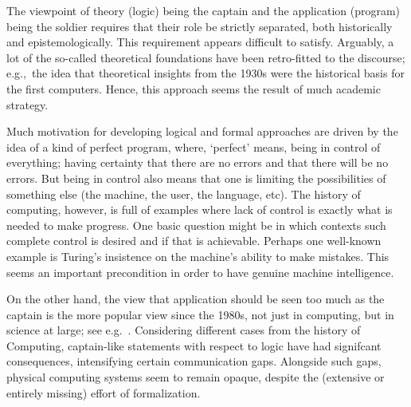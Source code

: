 \documentclass[]{article}
\begin{document}
The viewpoint of theory (logic) being the captain and the application (program) being the soldier requires that their role be strictly separated, both historically and
epistemologically. This requirement appears difficult to satisfy. Arguably, a lot of the so-called theoretical foundations have been retro-fitted to the discourse; e.g.,~the idea that theoretical insights from the 1930s were the historical basis for the first computers. Hence, this approach seems the result of much academic strategy.

Much motivation for developing logical and formal approaches are driven by
the idea of a kind of perfect program, where, `perfect' means, being in control of
everything; having certainty that there are no errors and that there will be no
errors. But being in control also means that one is limiting the
possibilities of something else (the machine, the user, the language, etc). 
The history of computing, however, is full of examples where lack of
control is exactly what is needed to make progress. One basic question might
be in which contexts such complete control is desired and if that is achievable.
Perhaps one well-known example is Turing's insistence on the machine's
ability to make mistakes. This seems an important precondition in order to
have genuine machine intelligence.

On the other hand, the view that application should be seen too much as the captain is the more popular view since the 1980s, not just in computing, but in science at large; see e.g.\ \cite{forman}. Considering different cases from the history of Computing,  captain-like statements with respect to logic have had signifcant consequences, intensifying certain communication gaps. Alongside such gaps, physical computing systems seem to remain opaque, despite the (extensive or entirely missing) effort of formalization. 
\end{document}
